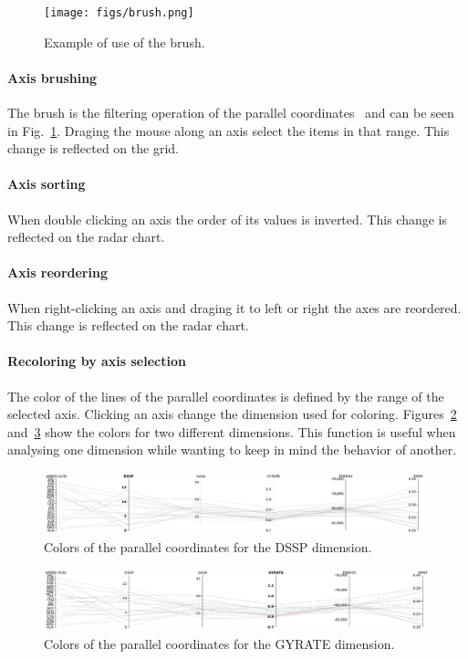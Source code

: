 \documentclass[10pt, conference]{IEEEtran}
\begin{document}
\begin{figure}
\texttt{[image: figs/brush.png]}
\caption{Example of use of the brush.} 
\label{fig:brush}
\end{figure}
\paragraph*{Axis brushing} The brush is the filtering operation of the parallel coordinates~\cite{siirtola2006interacting} and can be seen in Fig.~\ref{fig:brush}. Draging the mouse along an axis select the items in that range. This change is reflected on the grid.
\paragraph*{Axis sorting} When double clicking an axis the order of its values is inverted. This change is reflected on the radar chart.
\paragraph*{Axis reordering} When right-clicking an axis and draging it to left or right the axes are reordered. This change is reflected on the radar chart.
\paragraph*{Recoloring by axis selection} The color of the lines of the parallel coordinates is defined by the range of the selected axis. Clicking an axis change the dimension used for coloring. Figures~\ref{fig:dssp} and~\ref{fig:gyrate} show the colors for two different dimensions. This function is useful when analysing one dimension while wanting to keep in mind the behavior of another.

\begin{figure}
\includegraphics[width=1.0\linewidth]{figs/dssp.png}
\caption{Colors of the parallel coordinates for the DSSP dimension.} 
\label{fig:dssp}
\end{figure}

\begin{figure}
\includegraphics[width=1.0\linewidth]{figs/gyrate.png}
\caption{Colors of the parallel coordinates for the GYRATE dimension.} 
\label{fig:gyrate}
\end{figure}
\end{document}
